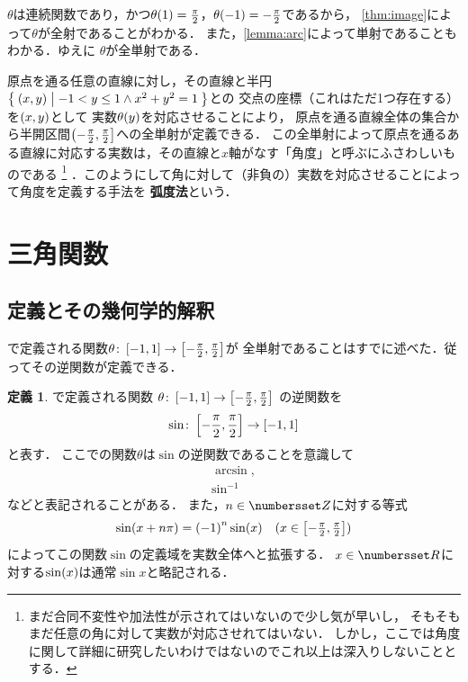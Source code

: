 \documentclass[11pt,a4paper]{ltjsarticle}
\newcommand*{\definition}[1]{\textbf{#1}}
\newcommand*{\coord}[1]{\paren{#1}}
\newcommand*{\maparrow}{\rightarrow}
\newcommand*{\inv}[1]{{#1}^{-1}}
\theoremstyle{definition}
\newtheorem{dfn}{定義}[section]
\begin{document}
$\theta$は連続関数であり，かつ$\apply{\theta}{1} = \frac{\pi}{2}$，$\apply{\theta}{-1} = - \frac{\pi}{2}$であるから，
\cref{thm:image}によって$\theta$が全射であることがわかる．
また，\cref{lemma:arc}によって単射であることもわかる．ゆえに
$\theta$が全単射である．

原点を通る任意の直線に対し，その直線と半円$\setintension{\coord{x,y}}{-1 < y \leq 1 \land x^2 + y^2 = 1}$との
交点の座標（これはただ1つ存在する）を$\coord{x,y}$として
実数$\apply{\theta}{y}$を対応させることにより，
原点を通る直線全体の集合から半開区間$\interval{lop}{-\frac{\pi}{2},\frac{\pi}{2}}$への全単射が定義できる．
この全単射によって原点を通るある直線に対応する実数は，その直線と$x$軸がなす「角度」と呼ぶにふさわしいものである%
\footnote{%
  まだ合同不変性や加法性が示されてはいないので少し気が早いし，
  そもそもまだ任意の角に対して実数が対応させれてはいない．
  しかし，ここでは角度に関して詳細に研究したいわけではないのでこれ以上は深入りしないこととする．
}%
．このようにして角に対して（非負の）実数を対応させることによって角度を定義する手法を
\definition{弧度法}という．


\section{三角関数} \label{sec:sincostan}

\subsection{定義とその幾何学的解釈} \label{subsec:dfngeo}

で定義される関数$\theta \colon \interval{c}{-1,1} \maparrow \interval{c}{- \frac{\pi}{2}, \frac{\pi}{2}}$が
全単射であることはすでに述べた．従ってその逆関数が定義できる．

\begin{dfn} \label{dfn:sin}
  で定義される関数
  $\theta \colon \interval{c}{-1,1} \maparrow \interval{c}{- \frac{\pi}{2}, \frac{\pi}{2}}$
  の逆関数を
  \begin{align}
    \sin \colon \interval{c}{- \frac{\pi}{2}, \frac{\pi}{2}} \maparrow \interval{c}{-1,1}
    \label{eq:sin}
  \end{align}
  と表す．
  ここでの関数$\theta$は$\sin$の逆関数であることを意識して
  \begin{align}
    \arcsin,
    \label{eq:arcsin} \\
    \inv{\sin}
    \label{eq:invsin}
  \end{align}
  などと表記されることがある．
  また，$n \in \Zahlen$に対する等式
  \begin{align}
    \apply{\sin}{x + n \pi} = \paren{-1}^n \apply{\sin}{x} \quad \text{($\textstyle x \in \interval{c}{-\frac{\pi}{2}, \frac{\pi}{2}}$)}
    \label{eq:sinperiod}
  \end{align}
  によってこの関数$\sin$の定義域を実数全体へと拡張する．
  $x \in \Real$に対する$\apply{\sin}{x}$は通常$\sin x$と略記される．
\end{dfn}
\end{document}
